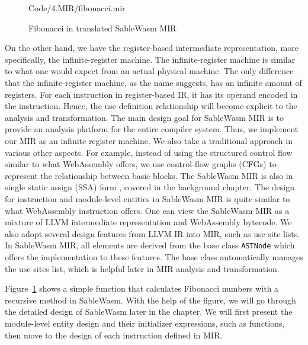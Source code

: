 \begin{figure}
  \centering
  
  {Code/4.MIR/fibonacci.mir}
  \caption{Fibonacci in translated SableWasm MIR}
  \label{fig:mir-fibonacci}
\end{figure}

On the other hand, we have the register-based intermediate representation, more specifically, the infinite-register machine. The infinite-register machine is similar to what one would expect from an actual physical machine. The only difference that the infinite-register machine, as the name suggests, has an infinite amount of registers. For each instruction in register-based IR, it has its operand encoded in the instruction. Hence, the use-definition relationship will become explicit to the analysis and transformation. The main design goal for SableWasm MIR is to provide an analysis platform for the entire compiler system. Thus, we implement our MIR as an infinite register machine. We also take a traditional approach in various other aspects. For example, instead of using the structured control flow similar to what WebAssembly offers, we use control-flow graphs (CFGs) to represent the relationship between basic blocks. The SableWasm MIR is also in single static assign (SSA) form \cite{ibm-ssa}, covered in the background chapter. The design for instruction and module-level entities in SableWasm MIR is quite similar to what WebAssembly instruction offers. One can view the SableWasm MIR as a mixture of LLVM intermediate representation and WebAssembly bytecode. We also adopt several design features from LLVM IR into MIR, such as use site lists. In SableWasm MIR, all elements are derived from the base class \texttt{ASTNode} which offers the implementation to these features. The base class automatically manages the use sites list, which is helpful later in MIR analysis and transformation.

Figure~\ref{fig:mir-fibonacci} shows a simple function that calculates Fibonacci numbers with a recursive method in SableWasm. With the help of the figure, we will go through the detailed design of SableWasm later in the chapter. We will first present the module-level entity design and their initializer expressions, such as functions, then move to the design of each instruction defined in MIR.





